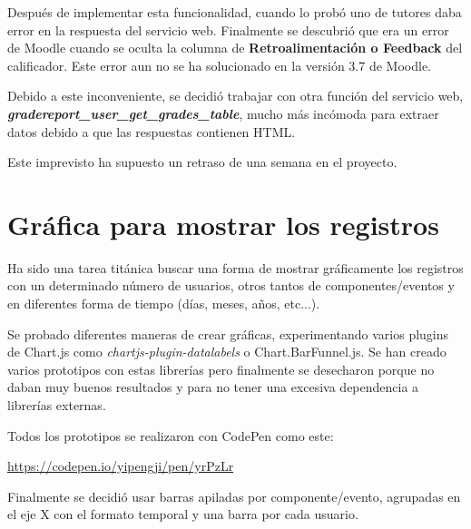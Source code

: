 Después de implementar esta funcionalidad, cuando lo probó uno de tutores daba error en la respuesta del servicio web. Finalmente se descubrió que era un error de Moodle cuando se oculta la columna de \textbf{Retroalimentación o Feedback} del calificador\cite{zadok_[mdl-64298]_nodate}. Este error aun no se ha solucionado en la versión 3.7 de Moodle.


Debido a este inconveniente, se decidió trabajar con otra función del servicio web, \textbf{\textit{gradereport\_user\_get\_grades\_table}}, mucho más incómoda para extraer datos debido a que las respuestas contienen HTML. 


Este imprevisto ha supuesto un retraso de una semana en el proyecto.

\section{Gráfica para mostrar los registros}

Ha sido una tarea titánica buscar una forma de mostrar gráficamente los registros con un determinado número de usuarios, otros tantos de componentes/eventos y en diferentes forma de tiempo (días, meses, años, etc...).

Se probado diferentes maneras de crear gráficas, experimentando varios plugins de Chart.js\cite{noauthor_plugins_nodate} como \textit{chartjs-plugin-datalabels}\cite{noauthor_chartjs-plugin-datalabels_nodate} o Chart.BarFunnel.js\cite{y-takey_this_2019}. Se han creado varios prototipos con estas librerías pero finalmente se desecharon porque no daban muy buenos resultados y para no tener una excesiva dependencia a librerías externas.

Todos los prototipos se realizaron con CodePen como este:

\href{https://codepen.io/yipengji/pen/yrPzLr}{https://codepen.io/yipengji/pen/yrPzLr}


Finalmente se decidió usar barras apiladas por componente/evento, agrupadas en el eje X con el formato temporal y una barra por cada usuario.



